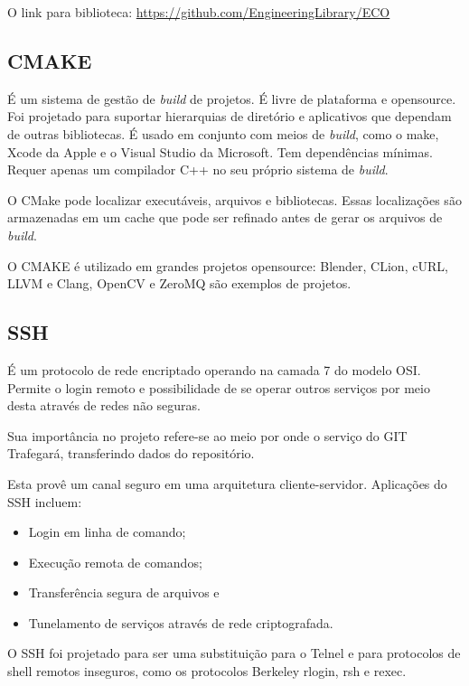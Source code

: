 \documentclass[
	article,			%
	12pt,				%
	oneside,			%
	a4paper,			%
	english,			
	brazil,
	sumario=tradicional
	]{abntex2}
\begin{document}
O link para biblioteca: \href{https://github.com/EngineeringLibrary/ECO}{https://github.com/EngineeringLibrary/ECO}


\subsection{CMAKE}
É um sistema de gestão de \textit{build} de projetos. É livre de plataforma e opensource. \cite{cmakeorg.1} Foi projetado para suportar hierarquias de diretório e aplicativos que dependam de outras bibliotecas. É usado em conjunto com meios de \textit{build}, como o make, Xcode da Apple e o Visual Studio da Microsoft. Tem dependências mínimas. Requer apenas um compilador C++ no seu próprio sistema de \textit{build}.

O CMake pode localizar executáveis, arquivos e bibliotecas. Essas localizações são armazenadas em um cache que pode ser refinado antes de gerar os arquivos de \textit{build}.

O CMAKE é utilizado em grandes projetos opensource: Blender, CLion, cURL, LLVM e Clang, OpenCV e ZeroMQ são exemplos de projetos.


\subsection{SSH}
É um protocolo de rede encriptado operando na camada 7 do modelo OSI. Permite o login remoto e possibilidade de se operar outros serviços por meio desta através de redes não seguras. \cite{ylonen2006secure}

Sua importância no projeto refere-se ao meio por onde o serviço do GIT Trafegará, transferindo dados do repositório.

Esta provê um canal seguro em uma arquitetura cliente-servidor. Aplicações do SSH incluem:

\begin{itemize}
	\item{Login em linha de comando;} \cite{ylonen2006secure.3}
	\item{Execução remota de comandos;} \cite{ylonen2006secure.3}
	\item{Transferência segura de arquivos e} \cite{ylonen2006secure.3}
	\item{Tunelamento de serviços através de rede criptografada.}\cite{ylonen2006secure.2}
\end{itemize}

O SSH foi projetado para ser uma substituição para o Telnel e para protocolos de shell remotos inseguros, como os protocolos Berkeley rlogin, rsh e rexec.
\end{document}
